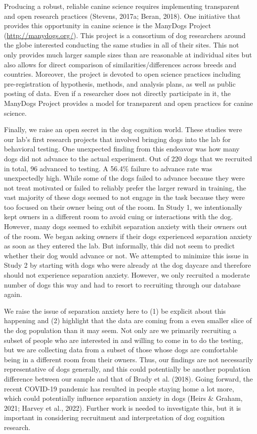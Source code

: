 \documentclass[
  pub,floatsintext]{apa6}
\begin{document}
Producing a robust, reliable canine science requires implementing transparent and open research practices (Stevens, 2017a; Beran, 2018). One initiative that provides this opportunity in canine science is the ManyDogs Project (\url{http://manydogs.org/}). This project is a consortium of dog researchers around the globe interested conducting the same studies in all of their sites. This not only provides much larger sample sizes than are reasonable at individual sites but also allows for direct comparison of similarities/differences across breeds and countries. Moreover, the project is devoted to open science practices including pre-registration of hypothesis, methods, and analysis plans, as well as public posting of data. Even if a researcher does not directly participate in it, the ManyDogs Project provides a model for transparent and open practices for canine science.

Finally, we raise an open secret in the dog cognition world. These studies were our lab's first research projects that involved bringing dogs into the lab for behavioral testing. One unexpected finding from this endeavor was how many dogs did not advance to the actual experiment. Out of 220 dogs that we recruited in total, 96 advanced to testing. A 56.4\% failure to advance rate was unexpectedly high. While some of the dogs failed to advance because they were not treat motivated or failed to reliably prefer the larger reward in training, the vast majority of these dogs seemed to not engage in the task because they were too focused on their owner being out of the room. In Study 1, we intentionally kept owners in a different room to avoid cuing or interactions with the dog. However, many dogs seemed to exhibit separation anxiety with their owners out of the room. We began asking owners if their dogs experienced separation anxiety as soon as they entered the lab. But informally, this did not seem to predict whether their dog would advance or not. We attempted to minimize this issue in Study 2 by starting with dogs who were already at the dog daycare and therefore should not experience separation anxiety. However, we only recruited a moderate number of dogs this way and had to resort to recruiting through our database again.

We raise the issue of separation anxiety here to (1) be explicit about this happening and (2) highlight that the data are coming from a even smaller slice of the dog population than it may seem. Not only are we primarily recruiting a subset of people who are interested in and willing to come in to do the testing, but we are collecting data from a subset of those whose dogs are comfortable being in a different room from their owners. Thus, our findings are not necessarily representative of dogs generally, and this could potentially be another population difference between our sample and that of Brady et al. (2018). Going forward, the recent COVID-19 pandemic has resulted in people staying home a lot more, which could potentially influence separation anxiety in dogs (Heirs \& Graham, 2021; Harvey et al., 2022). Further work is needed to investigate this, but it is important in considering recruitment and interpretation of dog cognition research.
\end{document}

